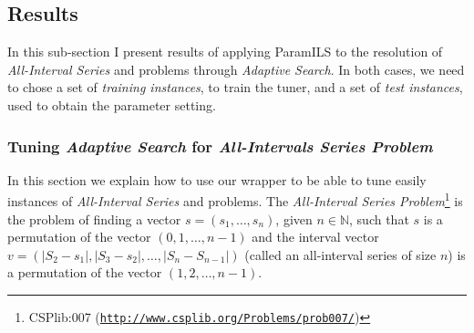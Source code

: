 %
%
%
%
%
%
%

\subsection{Results}

In this sub-section I present results of applying {\sc ParamILS} to the resolution of {\it All-Interval Series} and \carr{} problems through {\it Adaptive Search}. In both cases, we need to chose a set of {\it training instances}, to train the tuner, and a set of {\it test instances}, used to obtain the parameter setting. 

\subsubsection{ Tuning {\it Adaptive Search} for  {\it All-Intervals Series Problem}}

In this section we explain how to use our wrapper to be able to tune easily instances of {\it All-Interval Series} and \carr{} problems. The {\it All-Interval Series Problem}\footnote{CSPlib:007 (\href{http://www.csplib.org/Problems/prob007/}{\texttt{http://www.csplib.org/Problems/prob007/}})} is the problem of finding a vector $s=\left(s_1,\dots,s_n\right)$, given $n \in \mathbb{N}$, such that $s$ is a permutation of the vector $(0, 1, \dots, n-1)$ and the interval vector $v = \left(\left|S_2-s_1\right|, \left|S_3-s_2\right|, \dots, \left|S_n-S_{n-1}\right|\right)$ (called an all-interval series of size $n$) is a permutation of the vector $(1, 2, \dots, n-1)$. 

